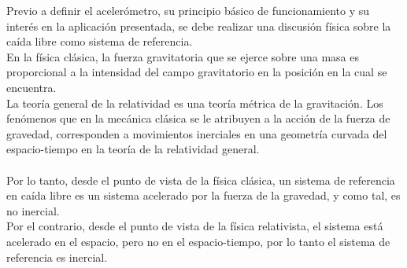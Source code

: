 \documentclass[main]{subfiles}
\begin{document}
Previo a definir el aceler\'ometro, su principio b\'asico de funcionamiento y su inter\'es en la aplicaci\'on presentada, se debe realizar una discusi\'on f\'isica sobre la ca\'ida libre como sistema de referencia.\\
En la f\'isica cl\'asica, la fuerza gravitatoria que se ejerce sobre una masa es proporcional a la intensidad del campo gravitatorio en la posici\'on en la cual se encuentra.\\ 
La teor\'ia general de la relatividad es una teor\'ia m\'etrica de la gravitaci\'on. Los fen\'omenos que en la mec\'anica cl\'asica se le atribuyen a la acci\'on de la fuerza de gravedad, corresponden a movimientos inerciales en una geometr\'ia curvada del espacio-tiempo en la teor\'ia de la relatividad general.\\
\\
Por lo tanto, desde el punto de vista de la f\'isica cl\'asica, un sistema de referencia en ca\'ida libre es un sistema acelerado por la fuerza de la gravedad, y como tal, es no inercial.\\
Por el contrario, desde el punto de vista de la f\'isica relativista, el sistema est\'a acelerado en el espacio, pero no en el espacio-tiempo, por lo tanto el sistema de referencia es inercial.\\
\end{document}
